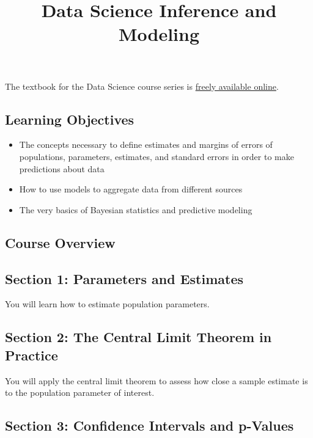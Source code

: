 \documentclass[
]{article}
\title{Data Science Inference and Modeling}
\author{}
\date{\vspace{-2.5em}}
\providecommand{\tightlist}{%
  \setlength{\itemsep}{0pt}\setlength{\parskip}{0pt}}
\begin{document}
\maketitle

The textbook for the Data Science course series is
\href{https://rafalab.github.io/dsbook/}{freely available online}.

\hypertarget{learning-objectives}{%
\subsection{Learning Objectives}\label{learning-objectives}}

\begin{itemize}
\tightlist
\item
  The concepts necessary to define estimates and margins of errors of
  populations, parameters, estimates, and standard errors in order to
  make predictions about data
\item
  How to use models to aggregate data from different sources
\item
  The very basics of Bayesian statistics and predictive modeling
\end{itemize}

\hypertarget{course-overview}{%
\subsection{Course Overview}\label{course-overview}}

\hypertarget{section-1-parameters-and-estimates}{%
\subsection{Section 1: Parameters and
Estimates}\label{section-1-parameters-and-estimates}}

You will learn how to estimate population parameters.

\hypertarget{section-2-the-central-limit-theorem-in-practice}{%
\subsection{Section 2: The Central Limit Theorem in
Practice}\label{section-2-the-central-limit-theorem-in-practice}}

You will apply the central limit theorem to assess how close a sample
estimate is to the population parameter of interest.

\hypertarget{section-3-confidence-intervals-and-p-values}{%
\subsection{Section 3: Confidence Intervals and
p-Values}\label{section-3-confidence-intervals-and-p-values}}
\end{document}
